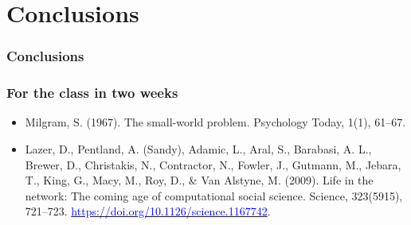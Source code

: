 \documentclass{beamer}
\begin{document}
\section{Conclusions}
\begin{frame}
   \frametitle{Conclusions}
\end{frame}

\begin{frame}
    \frametitle{For the class in two weeks}
    \begin{itemize}
        \item Milgram, S. (1967). The small-world problem. Psychology Today,
        1(1), 61–67.
        \item Lazer, D., Pentland, A. (Sandy), Adamic, L., Aral, S., Barabasi,
        A. L., Brewer, D., Christakis, N., Contractor, N., Fowler, J., Gutmann,
        M., Jebara, T., King, G., Macy, M., Roy, D., \& Van Alstyne, M. (2009).
        Life in the network: The coming age of computational social science.
        Science, 323(5915), 721–723. \href{https://doi.org/10.1126/science.1167742}{\textcolor{blue}{https://doi.org/10.1126/science.1167742}}.
    \end{itemize}
\end{frame}
\end{document}
